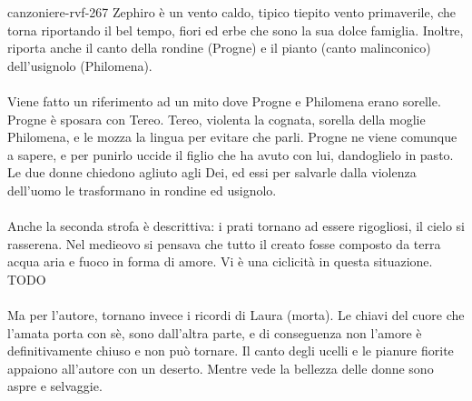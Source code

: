 \documentclass[preview]{standalone}
\begin{document}
\begin{snippet}{canzoniere-rvf-267}
    Zephiro è un vento caldo, tipico tiepito vento primaverile,
    che torna riportando il bel tempo, fiori ed erbe che sono la sua dolce famiglia.
    Inoltre, riporta anche il canto della rondine (Progne) e il pianto (canto malinconico)
    dell'usignolo (Philomena).
    \\\\
    Viene fatto un riferimento ad un mito dove Progne e Philomena erano sorelle.
    Progne è sposara con Tereo. Tereo, violenta la cognata, sorella della moglie Philomena,
    e le mozza la lingua per evitare che parli. Progne ne viene comunque a sapere,
    e per punirlo uccide il figlio che ha avuto con lui, dandoglielo in pasto.
    Le due donne chiedono agliuto agli Dei, ed essi per salvarle dalla violenza dell'uomo
    le trasformano in rondine ed usignolo.
    \\\\
    Anche la seconda strofa è descrittiva: i prati tornano ad essere rigogliosi, il cielo
    si rasserena.
    Nel medieovo si pensava che tutto il creato fosse composto da terra
    acqua aria e fuoco in forma di amore.
    Vi è una ciclicità in questa situazione.
    TODO
    \\\\
    Ma per l'autore, tornano invece i ricordi di Laura (morta).
    Le chiavi del cuore che l'amata porta con sè, sono dall'altra parte, e di conseguenza
    non l'amore è definitivamente chiuso e non può tornare.
    Il canto degli ucelli e le pianure fiorite appaiono all'autore con un deserto.
    Mentre vede la bellezza delle donne sono aspre e selvaggie.
\end{snippet}
\end{document}
